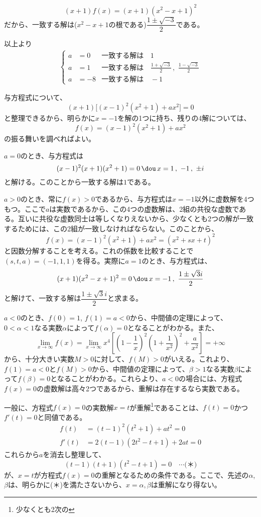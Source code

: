 \[(x+1)f(x) = (x+1)(x^2-x+1)^2\]
だから、一致する解は($x^2-x+1$の根である)$\dfrac{1 \pm \sqrt{-3}}{2}$である。\par 
以上より
\begin{align*}
 \left\{
 \begin{aligned}
  a&=0 & \text{一致する解は}&\, 1 \\
  a&=1 & \text{一致する解は}&\, \frac{1+\sqrt{-3}}{2}\,,\,\, \frac{1-\sqrt{-3}}{2} \\
  a&=-8 & \text{一致する解は}&\, -1
 \end{aligned}
 \right.
\end{align*}


与方程式について、
\[ (x+1)\bigl[(x-1)^2(x^2+1)+ax^2\bigr]=0 \]
と整理できるから、明らかに$x=-1$を解の1つに持ち、残りの4解については、
\[ f(x)=(x-1)^2(x^2+1)+ax^2 \]
の振る舞いを調べればよい。

$a=0$のとき、与方程式は
\[ (x-1)^2(x+1)(x^2+1)=0 \,\dou\, x=1 \,,\,\, -1 \,,\,\, \pm i \]
と解ける。このことから一致する解は$1$である。

$a>0$のとき、常に$f(x)>0$であるから、与方程式は$x=-1$以外に虚数解を4つもつ。ここで$a$は実数であるから、この4つの虚数解は、2組の共役な虚数である。互いに共役な虚数同士は等しくなりえないから、少なくとも2つの解が一致するためには、この2組が一致しなければならない。このことから、
\[ f(x)=(x-1)^2(x^2+1)+ax^2 = (x^2+sx+t)^2 \]
と因数分解することを考える。これの係数を比較することで$(s, t, a)=(-1, 1, 1)$を得る。実際に$a=1$のとき、与方程式は、
\[ (x+1)(x^2-x+1)^2=0 \,\dou\, x=-1\,,\,\, \frac{1\pm\sqrt{3}i}{2} \]
と解けて、一致する解は$\dfrac{1\pm\sqrt{3}i}{2}$と求まる。

$a<0$のとき、$f(0)=1$, $f(1)=a<0$から、中間値の定理によって、$0<\alpha<1$なる実数$\alpha$によって$f(\alpha)=0$となることがわかる。また、
\[\lim_{x\to\infty} f(x) = \lim_{x\to\infty} x^4\left[\left(1-\frac{1}{x}\right)^2\left(1+\frac{1}{x^2}\right)^2+\frac{a}{x^2}\right] =+\infty\]
から、十分大きい実数$M>0$に対して、$f(M)>0$がいえる。これより、$f(1)=a<0$と$f(M)>0$から、中間値の定理によって、$\beta>1$なる実数$\beta$によって$f(\beta)=0$となることがわかる。これらより、$a<0$の場合には、方程式$f(x)=0$の虚数解は高々2つであるから、重解は存在するなら実数である。

一般に、方程式$f(x)=0$の実数解$x=t$が重解\footnote{少なくとも2次の}であることは、$f(t)=0$かつ$f'(t)=0$と同値である。
\begin{align*}
 f(t)&=(t-1)^2(t^2+1)+at^2=0 \\
 f'(t)&=2(t-1)(2t^2-t+1)+2at=0
\end{align*}
これらから$a$を消去し整理して、
\[ (t-1)(t+1)(t^2-t+1)=0 \quad\cdots\text{(＊)}\]
が、$x=t$が方程式$f(x)=0$の重解となるための条件である。ここで、先述の$\alpha$, $\beta$は、明らかに(＊)を満たさないから、$x=\alpha, \beta$は重解になり得ない。

